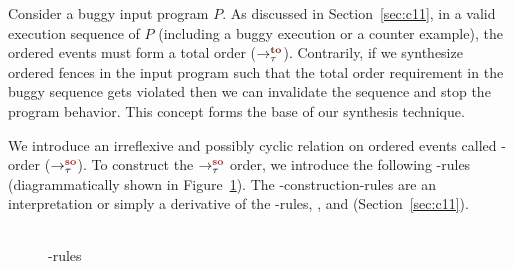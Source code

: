 Consider a buggy input program $P$.
%
As discussed in Section~\ref{sec:c11}, in a valid \cc execution 
sequence of $P$ (including a buggy execution or a counter example), 
the \sc ordered events must form a total order ($\setTO$).
%
Contrarily, if we synthesize \sc ordered fences in the input program 
such that the total order requirement in the buggy sequence gets violated 
then we can invalidate the sequence and stop the program behavior.
This concept forms the base of our synthesis technique.

We introduce an irreflexive and possibly cyclic relation
on \sc ordered events called \sc-order ($\setSO$).
%
To construct the $\setSO$ order, we introduce the following \lso-rules
(diagrammatically shown in Figure~\ref{fig:so rules}).
The \lso-construction-rules are an interpretation or simply a derivative 
of the \lto-rules, ,  and  
(Section~\ref{sec:c11}).

\begin{figure}[t]
	\begin{tabular}{|c||c|c|c|}
		\hline
		\resizebox{0.19\textwidth}{!}{} &
		\resizebox{0.19\textwidth}{!}{} &
		\resizebox{0.19\textwidth}{!}{} &
		\resizebox{0.19\textwidth}{!}{} \\
		\hline
	\end{tabular}
	\caption{\lso-rules}
	\label{fig:so rules}
\end{figure}

